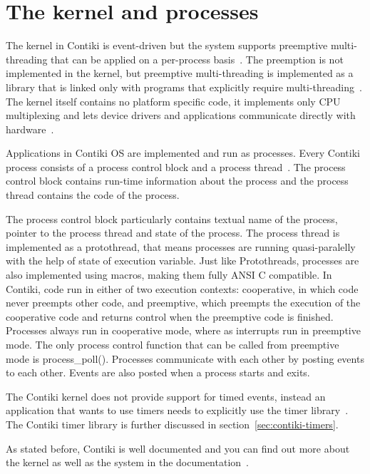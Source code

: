
\section{The kernel and processes}
The kernel in Contiki is event-driven but the system supports preemptive
multi-threading that can be applied on a per-process basis~\cite{video}.
The preemption is not implemented in the kernel, but
preemptive multi-threading is implemented as a library that is linked only with programs that
explicitly require multi-threading~\cite{paper-contiki}.
The kernel itself contains no platform specific code, it implements only CPU multiplexing and
lets device drivers and applications communicate directly with hardware~\cite{video}.

Applications in Contiki OS are implemented and run as processes.
Every Contiki process consists of a process control block and a process thread~\cite{contiki-wiki-processes}.
The process control block contains run-time information about the process and
the process thread contains the code of the process.

The process control block particularly contains
textual name of the process, pointer to the process thread and state of the process.
The process thread is implemented as a protothread,
that means processes are running quasi-paralelly with the help of state of execution variable.
Just like Protothreads, processes are also implemented using macros, making them fully ANSI C compatible.
In Contiki, code run in either of two execution contexts:
cooperative, in which code never preempts other code, and preemptive,
which preempts the execution of the cooperative code and returns control
when the preemptive code is finished.
Processes always run in cooperative mode, where as interrupts run in preemptive mode.
The only process control function that can be called from preemptive mode is process\_poll(). 
Processes communicate with each other by posting events to each other.
Events are also posted when a process starts and exits.

The Contiki kernel does not provide support for timed events,
instead an application that wants to use timers needs to explicitly use the timer library~\cite{contiki-docs}.
The Contiki timer library is further discussed in section~\ref{sec:contiki-timers}.

As stated before, Contiki is well documented and you can find out more about
the kernel as well as the system in the documentation~\cite{contiki-docs}.
